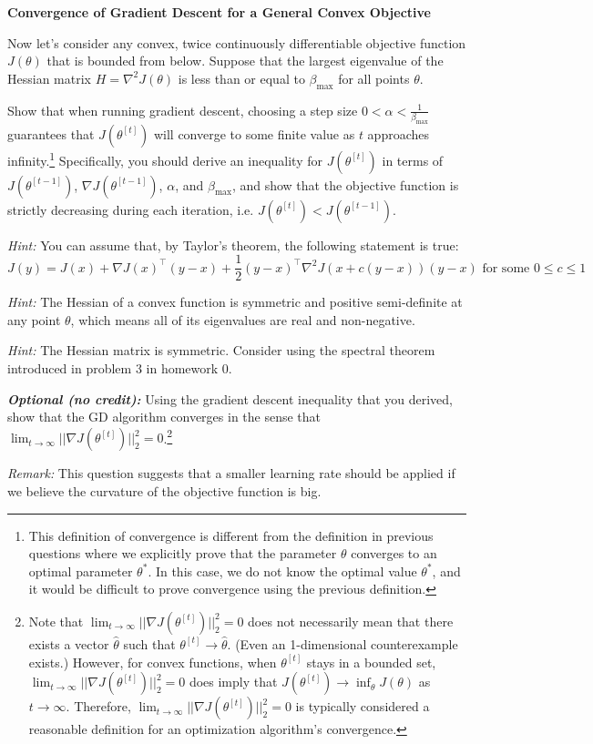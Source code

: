 \item {} {\bf Convergence of Gradient Descent for a General Convex Objective}

Now let's consider any convex, twice continuously differentiable objective function $J(\theta)$ that is bounded from below.
Suppose that the largest eigenvalue of the Hessian matrix $H=\nabla^2 J(\theta) $ is less than or equal to $\beta_{\max}$ for all points $\theta$.


Show that when running gradient descent, choosing a step size $0 < \alpha < \frac{1}{\beta_{\max}}$ guarantees that $J(\theta^{[t]})$ will converge to some finite value as $t$ approaches infinity.\footnote{This definition of convergence is different from the definition in previous questions where we explicitly prove that the parameter $\theta$ converges to an optimal parameter $\theta^*$. In this case, we do not know the optimal value $\theta^*$, and it would be difficult to prove convergence using the previous definition.} Specifically, you should derive an inequality for $J(\theta^{[t]})$ in terms of $J(\theta^{[t-1]})$, $\nabla J(\theta^{[t-1]})$, $\alpha$, and $\beta_{\max}$, and show that the objective function is strictly decreasing during each iteration, i.e. $J(\theta^{[t]}) < J(\theta^{[t-1]})$.


\textit{Hint:} You can assume that, by Taylor's theorem, the following statement is true:
\begin{equation*}
	J(y) = J(x) + \nabla J(x)^\top (y-x) + \frac{1}{2}(y-x)^\top \nabla^2 J(x + c(y-x)) (y-x) \text{ for some } 0 \leq c \leq 1
\end{equation*}


\textit{Hint:} The Hessian of a convex function is symmetric and positive semi-definite at any point $\theta$, which means all of its eigenvalues are real and non-negative.

\textit{Hint:} The Hessian matrix is symmetric. Consider using the spectral theorem introduced in problem 3 in homework 0.

\textit{\textbf{Optional (no credit):}}  Using the gradient descent inequality that you derived, show that the GD algorithm converges in the sense that  $\lim_{t\to\infty}||\nabla J(\theta^{[t]})||_{2}^{2}=0$.\footnote{Note that $\lim_{t\to\infty}||\nabla J(\theta^{[t]})||_{2}^{2}=0$ does not necessarily mean that there exists a vector $\hat{\theta}$ such that $\theta^{[t]} \rightarrow \hat{\theta}$. (Even an 1-dimensional counterexample exists.) However, for convex functions, when $\theta^{[t]}$ stays in a bounded set, $\lim_{t\to\infty}||\nabla J(\theta^{[t]})||_{2}^{2}=0$ does imply that $J(\theta^{[t]}) \rightarrow \inf_\theta J(\theta)$ as $t\rightarrow \infty$. Therefore, $\lim_{t\to\infty}||\nabla J(\theta^{[t]})||_{2}^{2}=0$ is typically considered a reasonable definition for an optimization algorithm's convergence.}

\textit{Remark:} This question suggests that a smaller learning rate should be applied if we believe the curvature of the objective function is big.